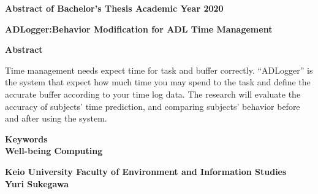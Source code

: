 \begin{center}
\textbf{\large Abstract of Bachelor's Thesis Academic Year 2020}

\vspace{6mm}

\textbf{\large ADLogger:Behavior Modification for ADL Time Management}
\end{center}

\vspace{10mm}


\begin{flushleft}
\textbf{Abstract}\\
\end{flushleft}

Time management needs expect time for task and buffer correctly. “ADLogger” is the system that expect how much time you may spend to the task and define the accurate buffer according to your time log data. The research will evaluate the accuracy of subjects’ time prediction, and comparing subjects’ behavior before and after using the system.

\begin{flushleft}
\textbf{Keywords}\\
\textbf{Well-being Computing}
\end{flushleft}

\begin{flushright}
\textbf{Keio University Faculty of Environment and Information Studies}\\
\textbf{Yuri Sukegawa}\\
\end{flushright}